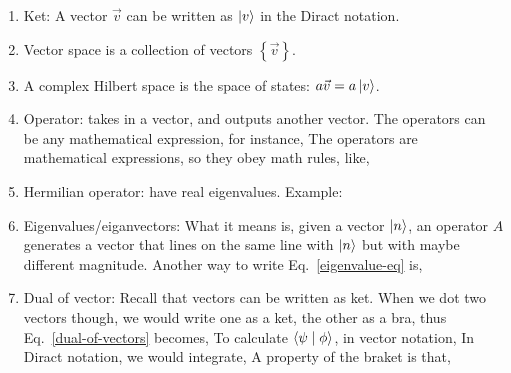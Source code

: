 \documentclass{school-22.101-notes}
\begin{document}
\begin{enumerate}
\item Ket: A vector $\vec{v}$ can be written as $\left| v \right>$ in the Diract notation. 

\item Vector space is a collection of vectors $\left\{ \vec{v} \right\}$. 

\item A complex Hilbert space is the space of states: $a \vec{v} = a \left| v \right>$. 

\item Operator: takes in a vector, and outputs another vector. The operators can be any mathematical expression, for instance,
The operators are mathematical expressions, so they obey math rules, like,

\item Hermilian operator: have real eigenvalues. Example: 

\item Eigenvalues/eiganvectors: 
  What it means is, given a vector $\left| n \right>$, an operator $A$ generates a vector that lines on the same line with $\left| n \right>$ but with maybe different magnitude. Another way to write Eq.~\ref{eigenvalue-eq} is, 

\item Dual of vector: 
  Recall that vectors can be written as ket. When we dot two vectors though, we would write one as a ket, the other as a bra, thus Eq.~\ref{dual-of-vectors} becomes, 
  To calculate $\langle \psi \mid \phi \rangle$, in vector notation, 
  \eqn{ \vec{\psi} \cdot \vec{\phi} = |\vec{\psi}| |\vec{\phi}| \cos \theta }
  In Diract notation, we would integrate, 
  A property of the braket is that, 
  \eqn{ \braket{\psi}{\phi} = \braket{\phi}{\psi}^* }





\end{enumerate}
\end{document}
